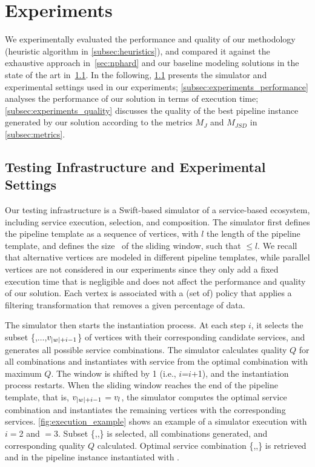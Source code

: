 \section{Experiments}\label{sec:experiment}
We experimentally evaluated the performance and quality of our methodology (heuristic algorithm in \cref{subsec:heuristics}), and compared it against the exhaustive approach in~\cref{sec:nphard} {\color{OurColor}and our baseline modeling solutions in the state of the art in~\cref{subsec:experiments_infrastructure}.} In the following,
\cref{subsec:experiments_infrastructure} presents the simulator and experimental settings used in our experiments;
\cref{subsec:experiments_performance} analyses the performance of our solution in terms of execution time; \cref{subsec:experiments_quality} discusses the quality of the best pipeline instance generated by our solution according to the metrics $M_J$ and $M_{JSD}$ in \cref{subsec:metrics}.

\subsection{Testing Infrastructure and Experimental Settings}\label{subsec:experiments_infrastructure}
Our testing infrastructure is a Swift-based simulator of a service-based ecosystem, including service execution, selection, and composition.
The simulator first defines the pipeline template as a sequence of vertices, with $l$ the length of the pipeline template, and defines the size \windowsize\ of the sliding window, such that \windowsize$\leq$$l$. We recall that alternative vertices are modeled in different pipeline templates, while parallel vertices are not considered in our experiments since they only add a fixed execution time that is negligible and does not affect the performance and quality of our solution. Each vertex is associated with a (set of) policy that applies a filtering transformation that removes a given percentage of data.


      The simulator then starts the instantiation process. At each step $i$, it selects the subset \{,$\ldots$,$v_{|w|+i-1}$\} of vertices with their corresponding candidate services, and generates all possible service combinations. The simulator calculates quality $Q$ for all combinations and instantiates  with service  from the optimal combination with maximum $Q$. The window is shifted by 1 (i.e., $i$=$i$+1), and the instantiation process restarts. When the sliding window reaches the end of the pipeline template, that is, $v_{|w|+i-1}$$=$$v_{l}$, the simulator computes the optimal service combination and instantiates the remaining vertices with the corresponding services. \cref{fig:execution_example} shows an example of a simulator execution with $i$$=$2 and \windowsize$=$3. Subset \{,,\} is selected, all combinations generated, and corresponding quality $Q$ calculated. Optimal service combination \{,,\} is retrieved and  in the pipeline instance instantiated with .

